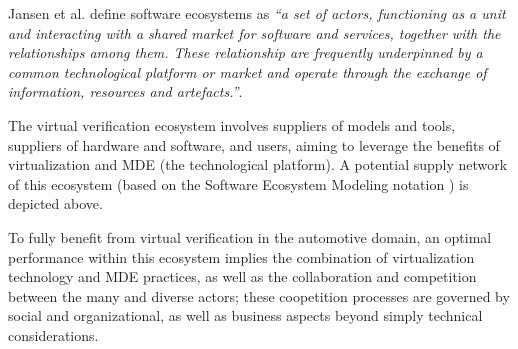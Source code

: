 \small
Jansen et al. \cite{Jansen2009} define software ecosystems as \emph{``a set of actors, functioning as a unit and interacting with a shared market for software and services, together with the relationships among them. These relationship are frequently underpinned by a common technological platform or market and operate through the exchange of information, resources and artefacts.''}.


The virtual verification ecosystem  \cite{Knauss2014d} involves suppliers of models and tools, suppliers of hardware and software, and users, aiming to leverage the benefits of virtualization and MDE (the technological platform). A potential supply network of this ecosystem (based on the Software Ecosystem Modeling notation \cite{Boucharas2009}) is depicted above.

To fully benefit from virtual verification in the automotive domain, an optimal performance within this ecosystem implies the combination of virtualization technology and MDE practices, as well as the collaboration and competition between the many and diverse actors; these coopetition processes are governed by social and organizational, as well as business aspects beyond simply technical considerations.



